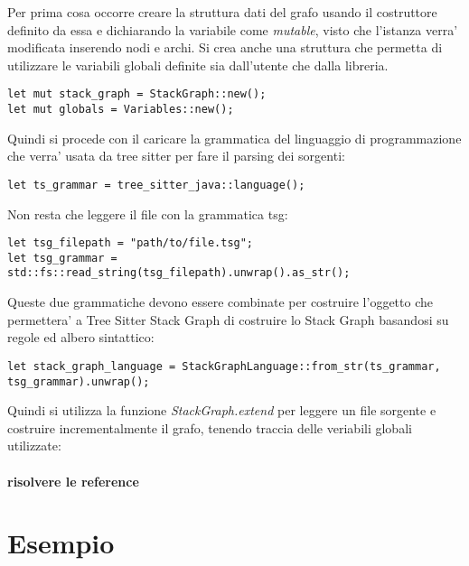 Per prima cosa occorre creare la struttura dati del grafo usando il costruttore definito da essa e dichiarando la variabile come \emph{mutable}, visto che l'istanza verra' modificata inserendo nodi e archi.
Si crea anche una struttura che permetta di utilizzare le variabili globali definite sia dall'utente che dalla libreria.

\begin{Verbatim}[samepage=true]
let mut stack_graph = StackGraph::new();
let mut globals = Variables::new();
\end{Verbatim}

Quindi si procede con il caricare la grammatica del linguaggio di programmazione che verra' usata da tree sitter per fare il parsing dei sorgenti:

\begin{Verbatim}[samepage=true]
let ts_grammar = tree_sitter_java::language();
\end{Verbatim}

Non resta che leggere il file con la grammatica tsg:

\begin{Verbatim}[samepage=true]
let tsg_filepath = "path/to/file.tsg";
let tsg_grammar = std::fs::read_string(tsg_filepath).unwrap().as_str();
\end{Verbatim}

Queste due grammatiche devono essere combinate per costruire l'oggetto che permettera' a Tree Sitter Stack Graph di costruire lo Stack Graph basandosi su regole ed albero sintattico:

\begin{Verbatim}[samepage=true]
let stack_graph_language = StackGraphLanguage::from_str(ts_grammar, tsg_grammar).unwrap();
\end{Verbatim}

Quindi si utilizza la funzione \emph{StackGraph.extend} per leggere un file sorgente e costruire incrementalmente il grafo, tenendo traccia delle veriabili globali utilizzate:

\paragraph{risolvere le reference}

\section{Esempio}

